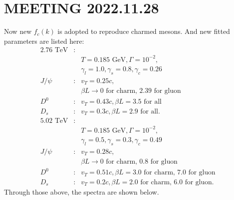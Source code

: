 \documentclass[twocolumn,aps,superscriptaddress,nofootinbib,floatfix]{revtex4}
\begin{document}
\section{MEETING 2022.11.28}
Now new $f_c(k)$ is adopted to reproduce charmed mesons. And new fitted parameters are listed here:
\begin{eqnarray}
	\text{2.76 TeV}&:&  \nonumber \\
	&&T=0.185 \text{ GeV}, \Gamma=10^{-2}, \nonumber \\
	&&\gamma_l=1.0,  \gamma_s=0.8 ,\gamma_c=0.26\nonumber \\
	J/\psi&:& v_T=0.25c,  \\ \nonumber
	&&\beta L\rightarrow \text{0 for charm, 2.39 for gluon}\nonumber\\
	D^0&:& v_T=0.43c,  \beta L=\text{3.5 for all}\nonumber\\
	D_s&:& v_T=0.3c,    \beta L=\text{2.9 for all}.\nonumber\\
	\text{5.02 TeV}&:&  \nonumber \\
	&&T=0.185 \text{ GeV}, \Gamma=10^{-2}, \nonumber \\
	&&\gamma_l=0.5,  \gamma_s=0.3 ,\gamma_c=0.49\nonumber \\
	J/\psi&:& v_T=0.28c,  \\ \nonumber
	&&\beta L\rightarrow \text{0 for charm, 0.8 for gluon}\nonumber\\
	D^0&:& v_T=0.51c,  \beta L=\text{3.0 for charm, 7.0 for gluon}\nonumber\\
	D_s&:& v_T=0.2c,    \beta L=\text{2.0 for charm, 6.0 for gluon}.\nonumber
\end{eqnarray}
Through those above, the spectra are shown below.
\end{document}
